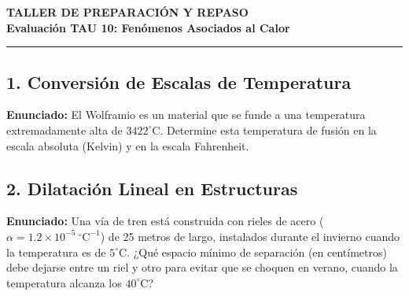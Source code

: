\documentclass[12pt, letterpaper]{article}
\begin{document}
	\begin{center}
		{\LARGE \textbf{TALLER DE PREPARACIÓN Y REPASO}}\\[0.2cm]
		{\Large \textbf{Evaluación TAU 10: Fenómenos Asociados al Calor}}\\[0.1cm]
		\hrule
	\end{center}
	
	\vspace{0.5cm}
	
	\subsection*{1. Conversión de Escalas de Temperatura}
	\noindent \textbf{Enunciado:} El Wolframio es un material que se funde a una temperatura extremadamente alta de $3422 ^{\circ}\text{C}$. Determine esta temperatura de fusión en la escala absoluta (Kelvin) y en la escala Fahrenheit.
	
	
	\subsection*{2. Dilatación Lineal en Estructuras}
	\noindent \textbf{Enunciado:} Una vía de tren está construida con rieles de acero ($\alpha = 1.2 \times 10^{-5} \ ^{\circ}\text{C}^{-1}$) de 25 metros de largo, instalados durante el invierno cuando la temperatura es de $5 ^{\circ}\text{C}$. ¿Qué espacio mínimo de separación (en centímetros) debe dejarse entre un riel y otro para evitar que se choquen en verano, cuando la temperatura alcanza los $40 ^{\circ}\text{C}$?
	
	
\end{document}
